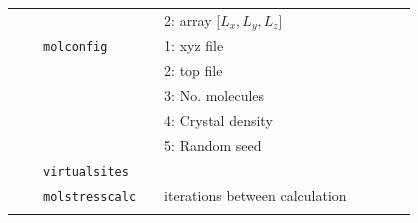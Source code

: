 \documentclass[11pt]{article}
\begin{document}
\begin{center}
\begin{tabular}{cclclcccc}
    $\mbox{}$ && $\mbox{}$      && 2: array [$L_x, L_y, L_z$] && \\
    $\mbox{}$ && \verb!molconfig!&& 1: \textsf{xyz} file && \\
              &&                 && 2: \textsf{top} file && \\
              &&                 && 3: No. molecules && \\
              &&                 && 4: Crystal density && \\
              &&                 && 5: Random seed && \\
              &&\verb!virtualsites!&& && \\
    $\mbox{}$ &&\verb!molstresscalc! && iterations between calculation && \\ 
    && && && \\
    \hline                                           
  \end{tabular}

\end{center}
\end{document}
